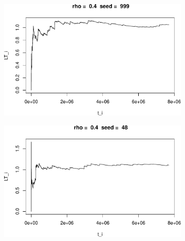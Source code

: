 \documentclass[]{article}
\begin{document}
\begin{figure}[h!]
\begin{subfigure}[b]{.55\linewidth}
\includegraphics[width=\linewidth]{003_files/figure-latex/unnamed-chunk-14-5.pdf}
\end{subfigure}\hfill
\begin{subfigure}[b]{.55\linewidth}
\includegraphics[width=\linewidth]{003_files/figure-latex/unnamed-chunk-14-6.pdf}
\end{subfigure}\vfill
\end{figure}
\end{document}
